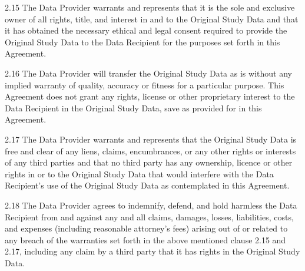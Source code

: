 2.15 The Data Provider warrants and represents that it is the sole and exclusive owner of all rights, title, and interest in and to the Original Study Data and that it has obtained the necessary ethical and legal consent required to provide the Original Study Data to the Data Recipient for the purposes set forth in this Agreement.

2.16 The Data Provider will transfer the Original Study Data as is without any implied warranty of quality, accuracy or fitness for a particular purpose. This Agreement does not grant any rights, license or other proprietary interest to the Data Recipient in the Original Study Data, save as provided for in this Agreement.

2.17 The Data Provider warrants and represents that the Original Study Data is free and clear of any liens, claims, encumbrances, or any other rights or interests of any third parties and that no third party has any ownership, licence or other rights in or to the Original Study Data that would interfere with the Data Recipient's use of the Original Study Data as contemplated in this Agreement.

2.18 The Data Provider agrees to indemnify, defend, and hold harmless the Data Recipient from and against any and all claims, damages, losses, liabilities, costs, and expenses (including reasonable attorney's fees) arising out of or related to any breach of the warranties set forth in the above mentioned clause 2.15 and 2.17, including any claim by a third party that it has rights in the Original Study Data.



